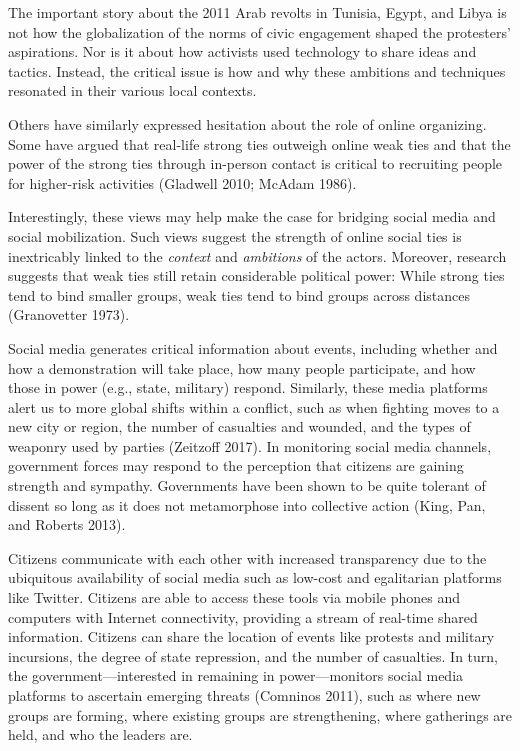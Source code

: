 \documentclass[
  english,
  man]{apa6}
\begin{document}
\begin{singlespace}
\setlength{\leftskip}{1cm}

\noindent The important story about the 2011
Arab revolts in Tunisia, Egypt, and Libya is not how the globalization of the
norms of civic engagement shaped the protesters' aspirations. Nor is it about
how activists used technology to share ideas and tactics. Instead, the critical
issue is how and why these ambitions and techniques resonated in their various
local contexts.

\setlength{\leftskip}{0pt}
\end{singlespace}

\noindent Others have similarly expressed hesitation about the role of online
organizing. Some have argued that real-life strong ties outweigh online weak
ties and that the power of the strong ties through in-person contact is critical
to recruiting people for higher-risk activities (Gladwell 2010; McAdam 1986).

Interestingly, these views may help make the case for bridging social media and
social mobilization. Such views suggest the strength of online social ties is
inextricably linked to the \emph{context} and \emph{ambitions} of the actors. Moreover,
research suggests that weak ties still retain considerable political power:
While strong ties tend to bind smaller groups, weak ties tend to bind groups
across distances (Granovetter 1973).

Social media generates critical information about events, including whether and
how a demonstration will take place, how many people participate, and how those
in power (e.g., state, military) respond. Similarly, these media platforms alert
us to more global shifts within a conflict, such as when fighting moves to a new
city or region, the number of casualties and wounded, and the types of weaponry
used by parties (Zeitzoff 2017). In monitoring social media channels,
government forces may respond to the perception that citizens are gaining
strength and sympathy. Governments have been shown to be quite tolerant of
dissent so long as it does not metamorphose into collective action
(King, Pan, and Roberts 2013).

Citizens communicate with each other with increased transparency due to the
ubiquitous availability of social media such as low-cost and egalitarian
platforms like Twitter. Citizens are able to access these tools via mobile
phones and computers with Internet connectivity, providing a stream of real-time
shared information. Citizens can share the location of events like protests and
military incursions, the degree of state repression, and the number of
casualties. In turn, the government---interested in remaining in
power---monitors social media platforms to ascertain emerging threats
(Comninos 2011), such as where new groups are forming, where existing
groups are strengthening, where gatherings are held, and who the leaders are.
\end{document}
